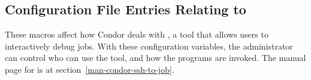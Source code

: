 %
%
%
%

\subsection{\label{sec:Config-ssh-to-job}Configuration File Entries
Relating to }

These macros affect how Condor deals with ,
a tool that allows users to interactively debug jobs.  
With these configuration variables, 
the administrator can control who can use the tool,
and how the  programs are invoked.
The manual page for  is at
section~\ref{man-condor-ssh-to-job}.

